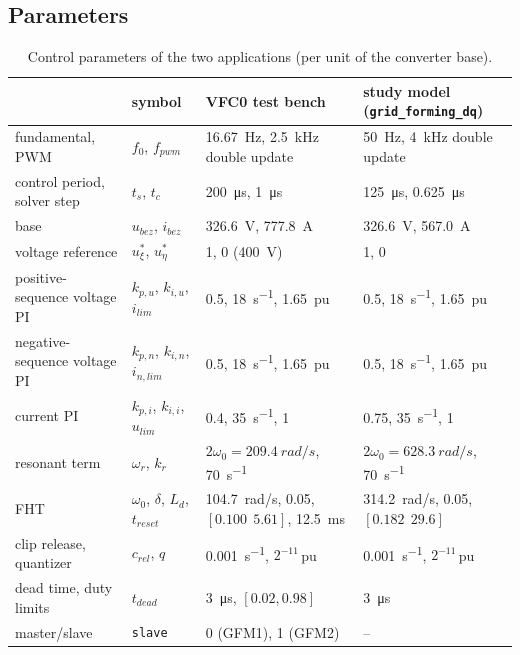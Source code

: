 \documentclass[10pt,a4paper]{scrartcl}
\newcommand{\ts}{t_s}
\newcommand{\wo}{\omega_0}
\newcommand{\wres}{\omega_r}
\newcommand{\kpi}{k_{p,i}}
\newcommand{\kii}{k_{i,i}}
\newcommand{\kpu}{k_{p,u}}
\newcommand{\kiu}{k_{i,u}}
\newcommand{\kpn}{k_{p,n}}
\newcommand{\kin}{k_{i,n}}
\newcommand{\code}[1]{\texttt{#1}}
\begin{document}
\begin{onehalfspace}
\clearpage
\section{Parameters}
\label{sec:parameters}

\begin{table}[htb]
\centering\footnotesize\setlength{\tabcolsep}{4pt}
\caption{Control parameters of the two applications (per unit of the converter base).}
\label{tab:param}
\begin{tabular}{@{}llll@{}}
\toprule
 & symbol & VFC0 test bench & study model (\code{grid\_forming\_dq}) \\
\midrule
fundamental, PWM & $f_0$, $f_{pwm}$ & \SI{16.67}{Hz}, \SI{2.5}{kHz} double update & \SI{50}{Hz}, \SI{4}{kHz} double update \\
control period, solver step & $\ts$, $t_c$ & \SI{200}{\micro s}, \SI{1}{\micro s} & \SI{125}{\micro s}, \SI{0.625}{\micro s} \\
base & $u_{bez}$, $i_{bez}$ & \SI{326.6}{V}, \SI{777.8}{A} & \SI{326.6}{V}, \SI{567.0}{A} \\
voltage reference & $u^*_\xi$, $u^*_\eta$ & 1, 0 (\SI{400}{V}) & 1, 0 \\
positive-sequence voltage PI & $\kpu$, $\kiu$, $i_{lim}$ & 0.5, \SI{18}{s^{-1}}, \SI{1.65}{pu} & 0.5, \SI{18}{s^{-1}}, \SI{1.65}{pu} \\
negative-sequence voltage PI & $\kpn$, $\kin$, $i_{n,lim}$ & 0.5, \SI{18}{s^{-1}}, \SI{1.65}{pu} & 0.5, \SI{18}{s^{-1}}, \SI{1.65}{pu} \\
current PI & $\kpi$, $\kii$, $u_{lim}$ & 0.4, \SI{35}{s^{-1}}, 1 & 0.75, \SI{35}{s^{-1}}, 1 \\
resonant term & $\wres$, $k_r$ & $2\wo = \SI{209.4}{rad/s}$, \SI{70}{s^{-1}} & $2\wo = \SI{628.3}{rad/s}$, \SI{70}{s^{-1}} \\
FHT & $\wo$, $\delta$, $L_d$, $t_{reset}$ & \SI{104.7}{rad/s}, 0.05, $[0.100\ \ 5.61]$, \SI{12.5}{ms} & \SI{314.2}{rad/s}, 0.05, $[0.182\ \ 29.6]$ \\
clip release, quantizer & $c_{rel}$, $q$ & \SI{0.001}{s^{-1}}, $2^{-11}$\,pu & \SI{0.001}{s^{-1}}, $2^{-11}$\,pu \\
dead time, duty limits & $t_{dead}$ & \SI{3}{\micro s}, $[0.02, 0.98]$ & \SI{3}{\micro s} \\
master/slave & \code{slave} & 0 (GFM1), 1 (GFM2) & -- \\
\bottomrule
\end{tabular}
\end{table}


\end{onehalfspace}
\end{document}
